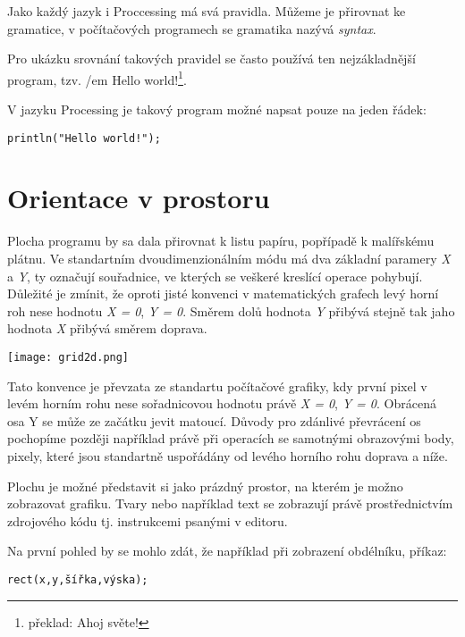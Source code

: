 \documentclass[11pt]{article}
\begin{document}
Jako každý jazyk i Proccessing má svá pravidla. Můžeme je přirovnat ke gramatice, v počítačových programech se gramatika nazývá {\em syntax}.

Pro ukázku srovnání takových pravidel se často používá ten nejzákladnější program, tzv. {/em Hello world!}\footnote{překlad: Ahoj světe!}.

V jazyku Processing je takový program možné napsat pouze na jeden řádek:

\begin{lstlisting}
println("Hello world!");
\end{lstlisting}



\newpage
\section{Orientace v prostoru}

Plocha programu by sa dala přirovnat k listu papíru, popřípadě k malířskému plátnu. Ve standartním dvoudimenzionálním módu má dva základní paramery {\em X} a {\em Y}, ty označují souřadnice, ve kterých se veškeré kreslící operace pohybují. Důležité je zmínit, že oproti jisté konvenci v matematických grafech levý horní roh nese hodnotu {\em X = 0}, {\em Y = 0}. Směrem dolů hodnota {\em Y} přibývá stejně tak jaho hodnota {\em X} přibývá směrem doprava.\\

\begin{center}
\texttt{[image: grid2d.png]}
\end{center}

Tato konvence je převzata ze standartu počítačové grafiky, kdy první pixel v levém horním rohu nese sořadnicovou hodnotu právě {\em X = 0}, {\em Y = 0}. Obrácená osa Y se může ze začátku jevit matoucí. Důvody pro zdánlivé převrácení os pochopíme později například právě při operacích se samotnými obrazovými body, pixely, které jsou standartně uspořádány od levého horního rohu doprava a níže.

Plochu je možné představit si jako prázdný prostor, na kterém je možno zobrazovat grafiku. Tvary nebo například text se zobrazují právě prostřednictvím zdrojového kódu tj. instrukcemi psanými v editoru.

Na první pohled by se mohlo zdát, že například při zobrazení obdélníku, příkaz:

\begin{lstlisting}
rect(x,y,šířka,výska);
\end{lstlisting}
\end{document}
